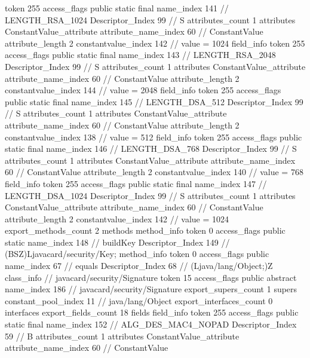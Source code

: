 {{{{{				token	255
				access_flags	public static final
				name_index	141		// LENGTH_RSA_1024
				Descriptor_Index	99		// S
				attributes_count	1
				attributes {
				ConstantValue_attribute {
					attribute_name_index	60		// ConstantValue
					attribute_length	2
					constantvalue_index	142		// value = 1024
				}
				}
			}
			field_info {
				token	255
				access_flags	public static final
				name_index	143		// LENGTH_RSA_2048
				Descriptor_Index	99		// S
				attributes_count	1
				attributes {
				ConstantValue_attribute {
					attribute_name_index	60		// ConstantValue
					attribute_length	2
					constantvalue_index	144		// value = 2048
				}
				}
			}
			field_info {
				token	255
				access_flags	public static final
				name_index	145		// LENGTH_DSA_512
				Descriptor_Index	99		// S
				attributes_count	1
				attributes {
				ConstantValue_attribute {
					attribute_name_index	60		// ConstantValue
					attribute_length	2
					constantvalue_index	138		// value = 512
				}
				}
			}
			field_info {
				token	255
				access_flags	public static final
				name_index	146		// LENGTH_DSA_768
				Descriptor_Index	99		// S
				attributes_count	1
				attributes {
				ConstantValue_attribute {
					attribute_name_index	60		// ConstantValue
					attribute_length	2
					constantvalue_index	140		// value = 768
				}
				}
			}
			field_info {
				token	255
				access_flags	public static final
				name_index	147		// LENGTH_DSA_1024
				Descriptor_Index	99		// S
				attributes_count	1
				attributes {
				ConstantValue_attribute {
					attribute_name_index	60		// ConstantValue
					attribute_length	2
					constantvalue_index	142		// value = 1024
				}
				}
			}
			}
			export_methods_count	2
			methods {
				method_info {
					token	0
					access_flags	public static
					name_index	148		// buildKey
					Descriptor_Index	149		// (BSZ)Ljavacard/security/Key;
				}
				method_info {
					token	0
					access_flags	public
					name_index	67		// equals
					Descriptor_Index	68		// (Ljava/lang/Object;)Z
				}
			}
		}
		class_info {		// javacard/security/Signature
			token	15
			access_flags	public abstract
			name_index	186		// javacard/security/Signature
			export_supers_count	1
			supers {
				constant_pool_index	11		// java/lang/Object
			}
			export_interfaces_count	0
			interfaces {
			}
			export_fields_count	18
			fields {
			field_info {
				token	255
				access_flags	public static final
				name_index	152		// ALG_DES_MAC4_NOPAD
				Descriptor_Index	59		// B
				attributes_count	1
				attributes {
				ConstantValue_attribute {
					attribute_name_index	60		// ConstantValue
}}}}}}}
